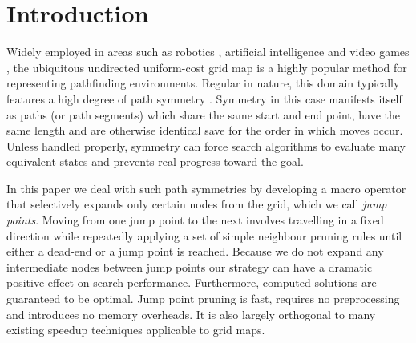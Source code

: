\section{Introduction}
Widely employed in areas such as robotics \cite{lee09}, artificial intelligence
\cite{wang09} and video games \cite{davis00,sturtevant07}, the ubiquitous
undirected uniform-cost grid map is a highly popular method for representing
pathfinding environments.  Regular in nature, this domain typically features a
high degree of path symmetry \cite{harabor10,pochter10}.  Symmetry in this case
manifests itself as paths (or path segments) which share the same start and end
point, have the same length and are otherwise identical save for the order in
which moves occur.  Unless handled properly, symmetry can force search
algorithms to evaluate many equivalent states and prevents real progress toward
the goal.

In this paper we deal with such path symmetries by developing a macro operator
that selectively expands only certain nodes from the grid, which we call
\emph{jump points}. Moving from one jump point to the next involves travelling
in a fixed direction while repeatedly applying a set of simple neighbour pruning
rules until either a dead-end or a jump point is reached.  Because we do not
expand any intermediate nodes between jump points our strategy can have a
dramatic positive effect on search performance.  Furthermore, computed solutions
are guaranteed to be optimal.  Jump point pruning is fast, requires no
preprocessing and introduces no memory overheads. It is also largely orthogonal to many
existing speedup techniques applicable to grid maps.

